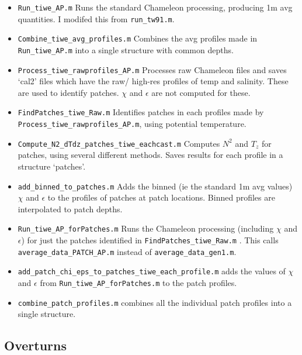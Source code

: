 \documentclass[11pt]{article}
\begin{document}
\begin{itemize}

\item \verb+Run_tiwe_AP.m+ Runs the standard Chameleon processing, producing 1m avg quantities. I modifed this from \verb+run_tw91.m+.

\item \verb+Combine_tiwe_avg_profiles.m+ Combines the avg profiles made in \verb+Run_tiwe_AP.m+ into a single structure with common depths.

\item \verb+Process_tiwe_rawprofiles_AP.m+  Processes raw Chameleon files and saves `cal2' files which have the raw/ high-res profiles of temp and salinity. These are used to identify patches. $\chi$ and $\epsilon$ are not computed for these.

\item \verb+FindPatches_tiwe_Raw.m+ Identifies patches in each profiles made by \verb+Process_tiwe_rawprofiles_AP.m+, using potential temperature.

\item \verb+Compute_N2_dTdz_patches_tiwe_eachcast.m+ Computes $N^2$ and $T_z$ for patches, using several different methods. Saves results for each profile in a structure `patches'.

\item \verb+add_binned_to_patches.m+ Adds the binned (ie the standard 1m avg values) $\chi$ and $\epsilon$ to the profiles of patches at patch locations. Binned profiles are interpolated to patch depths.

\item \verb+Run_tiwe_AP_forPatches.m+ Runs the Chameleon processing (including $\chi$ and $\epsilon$) for just the patches identified in \verb+FindPatches_tiwe_Raw.m+ . This calls \verb+average_data_PATCH_AP.m+ instead of \verb+average_data_gen1.m+.

\item \verb+add_patch_chi_eps_to_patches_tiwe_each_profile.m+ adds the values of $\chi$ and $\epsilon$ from \verb+Run_tiwe_AP_forPatches.m+ to the patch profiles.

\item \verb+combine_patch_profiles.m+ combines all the individual patch profiles into a single structure.


\end{itemize}

\medskip

\subsection{Overturns}
\end{document}

